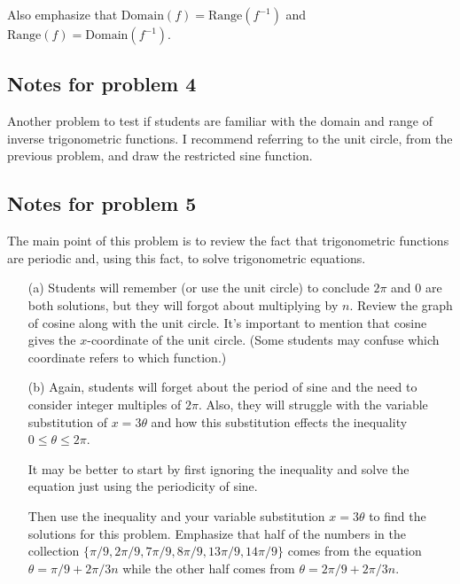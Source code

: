 \documentclass[nooutcomes]{ximera}
\begin{document}
Also emphasize that $\mathrm{Domain}(f) = \mathrm{Range}(f^{-1})$ and $\mathrm{Range}(f) = \mathrm{Domain}(f^{-1})$.

\subsection*{Notes for problem 4}
Another problem to test if students are familiar with the domain and range of inverse trigonometric functions.
I recommend referring to the unit circle, from the previous problem, and draw the restricted sine function.

\subsection*{Notes for problem 5}
The main point of this problem is to review the fact that trigonometric functions are periodic and, using this fact, to solve trigonometric equations.
\begin{itemize}
  \item[(a)]
    Students will remember (or use the unit circle) to conclude $2\pi$ and 0 are both solutions, but they will forgot about multiplying by $n$.
    Review the graph of cosine along with the unit circle.
    It's important to mention that cosine gives the $x$-coordinate of the unit circle.
    (Some students may confuse which coordinate refers to which function.)

  \item[(b)]
    Again, students will forget about the period of sine and the need to consider integer multiples of $2\pi$.
    Also, they will struggle with the variable substitution of $x=3\theta$ and how this substitution effects the inequality $0 \le \theta \le 2\pi$.

    It may be better to start by first ignoring the inequality and solve the equation just using the periodicity of sine.
    
    Then use the inequality and your variable substitution $x=3\theta$ to find the solutions for this problem.
    Emphasize that half of the numbers in the collection $\{ \pi/9, 2\pi/9, 7\pi/9, 8\pi/9, 13\pi/9, 14\pi/9 \}$ comes from the equation $\theta = \pi/9 + 2\pi/3n$ while the other half comes from $\theta = 2\pi/9 + 2\pi/3n$.
\end{itemize}
\end{document}
